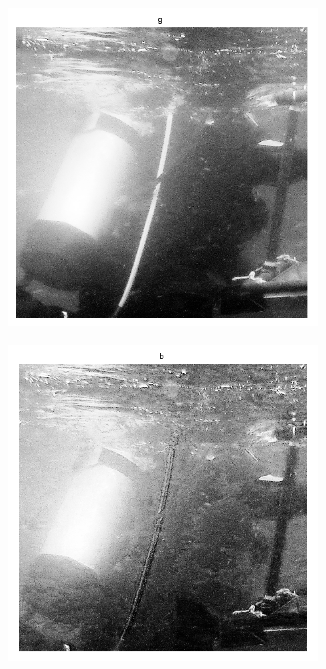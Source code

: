 \documentclass{article}
\begin{document}
\begin{figure}[H]
\begin{subfigure}{0.5\textwidth}
    \end{subfigure}\hfill
	\begin{subfigure}{0.5\textwidth}
	\centering
        \includegraphics[width=0.9\textwidth]{1908xx-ecualizacion-g.png}
    \end{subfigure}\hfill
	\begin{subfigure}{0.5\textwidth}
	\centering
        \includegraphics[width=0.9\textwidth]{1908xx-ecualizacion-b.png}

\end{subfigure}
\end{figure}
\end{document}
